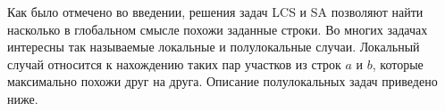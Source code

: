 Как было отмечено во введении, решения задач LCS и SA позволяют найти насколько в глобальном смысле похожи заданные строки.
Во многих задачах интересны так называемые локальные и полулокальные случаи.
Локальный случай относится к нахождению таких пар участков из строк $a$ и $b$, которые максимально похожи друг на друга.
Описание полулокальных задач приведено ниже.



